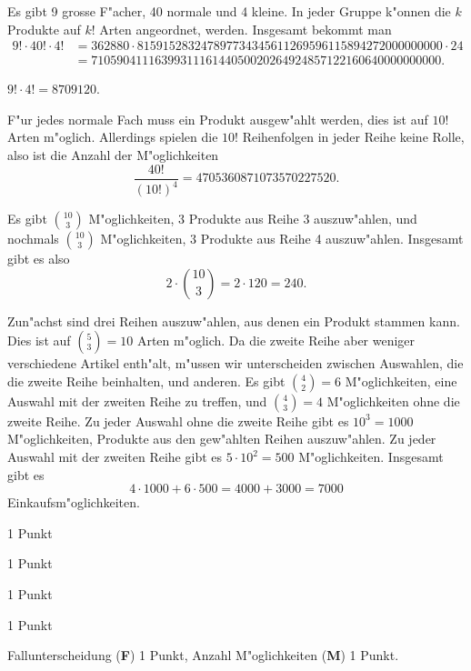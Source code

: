 \begin{loesung}
\begin{teilaufgaben}
\item Es gibt 9 grosse F"acher, 40 normale und 4 kleine. In jeder Gruppe
k"onnen die $k$ Produkte auf $k!$ Arten angeordnet, werden. Insgesamt 
bekommt man
\begin{align*}
9!\cdot 40!\cdot 4!&=
362880\cdot 815915283247897734345611269596115894272000000000 \cdot 24
\\
&=7105904111639931116144050020264924857122160640000000000.
\end{align*}
\item $9!\cdot 4!=8709120$.
\item
F"ur jedes normale Fach muss ein Produkt ausgew"ahlt werden, dies ist
auf $10!$ Arten m"oglich. Allerdings spielen die $10!$ Reihenfolgen
in jeder Reihe keine Rolle, also ist die Anzahl der M"oglichkeiten
\[
\frac{40!}{(10!)^4}=4705360871073570227520.
\]
\item
Es gibt $\binom{10}{3}$ M"oglichkeiten, $3$ Produkte aus Reihe 3
auszuw"ahlen, und nochmals $\binom{10}{3}$ M"oglichkeiten, $3$ Produkte
aus Reihe 4 auszuw"ahlen. Insgesamt gibt es also 
\[
2\cdot\binom{10}{3}=2\cdot 120=240.
\]
\item
Zun"achst sind drei Reihen auszuw"ahlen, aus denen ein Produkt stammen
kann.
Dies ist auf $\binom{5}{3}=10$ Arten m"oglich.
Da die zweite Reihe aber weniger verschiedene Artikel enth"alt, m"ussen
wir unterscheiden zwischen Auswahlen, die die zweite Reihe beinhalten,
und anderen.
Es gibt $\binom{4}{2}=6$ M"oglichkeiten, eine Auswahl mit der zweiten
Reihe zu treffen, und $\binom{4}{3}=4$ M"oglichkeiten ohne die zweite Reihe.
Zu jeder Auswahl ohne die zweite Reihe gibt es $10^3=1000$ M"oglichkeiten,
Produkte aus den gew"ahlten Reihen auszuw"ahlen.
Zu jeder Auswahl mit der zweiten Reihe gibt es $5\cdot 10^2=500$ M"oglichkeiten.
Insgesamt gibt es 
\[
4\cdot 1000
+
6\cdot 500
=4000 + 3000=7000
\]
Einkaufsm"oglichkeiten.
\qedhere
\end{teilaufgaben}
\end{loesung}

\begin{bewertung}
\begin{teilaufgaben}
\item 1 Punkt
\item 1 Punkt
\item 1 Punkt
\item 1 Punkt
\item Fallunterscheidung (\textbf{F}) 1 Punkt,
Anzahl M"oglichkeiten (\textbf{M}) 1 Punkt.
\end{teilaufgaben}
\end{bewertung}

